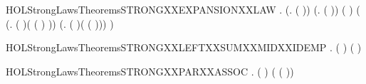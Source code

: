 \begin{SaveVerbatim}{HOLStrongLawsTheoremsSTRONGXXEXPANSIONXXLAW}
\HOLTokenTurnstile{} \HOLSymConst{\HOLTokenForall{}}   .
       (\HOLSymConst{\HOLTokenForall{}}.  \HOLSymConst{\HOLTokenLeq{}}  \HOLSymConst{\HOLTokenImp{}}  ( )) \HOLSymConst{\HOLTokenConj{}}
       (\HOLSymConst{\HOLTokenForall{}}.  \HOLSymConst{\HOLTokenLeq{}}  \HOLSymConst{\HOLTokenImp{}}  ( )) \HOLSymConst{\HOLTokenImp{}}
        (   \HOLSymConst{\ensuremath{\parallel}}   )
         (
            (\HOLTokenLambda{}.  ( )( ( ) \HOLSymConst{\ensuremath{\parallel}}   ))
             \HOLSymConst{+}
            (\HOLTokenLambda{}.  ( )(   \HOLSymConst{\ensuremath{\parallel}}  ( )))
             \HOLSymConst{+}     )
\end{SaveVerbatim}
\newcommand{\HOLStrongLawsTheoremsSTRONGXXEXPANSIONXXLAW}{\UseVerbatim{HOLStrongLawsTheoremsSTRONGXXEXPANSIONXXLAW}}
\begin{SaveVerbatim}{HOLStrongLawsTheoremsSTRONGXXLEFTXXSUMXXMIDXXIDEMP}
\HOLTokenTurnstile{} \HOLSymConst{\HOLTokenForall{}}  .  ( \HOLSymConst{+}  \HOLSymConst{+}  \HOLSymConst{+} ) ( \HOLSymConst{+}  \HOLSymConst{+} )
\end{SaveVerbatim}
\newcommand{\HOLStrongLawsTheoremsSTRONGXXLEFTXXSUMXXMIDXXIDEMP}{\UseVerbatim{HOLStrongLawsTheoremsSTRONGXXLEFTXXSUMXXMIDXXIDEMP}}
\begin{SaveVerbatim}{HOLStrongLawsTheoremsSTRONGXXPARXXASSOC}
\HOLTokenTurnstile{} \HOLSymConst{\HOLTokenForall{}}  .  ( \HOLSymConst{\ensuremath{\parallel}}  \HOLSymConst{\ensuremath{\parallel}} ) ( \HOLSymConst{\ensuremath{\parallel}} ( \HOLSymConst{\ensuremath{\parallel}} ))
\end{SaveVerbatim}
